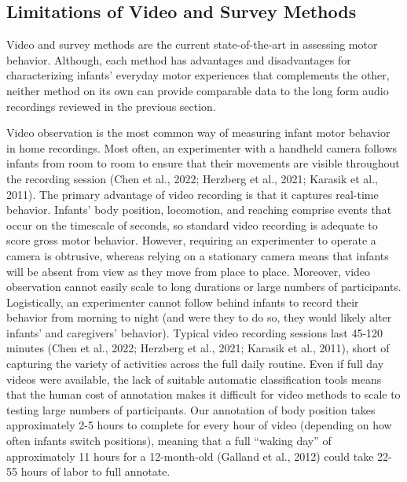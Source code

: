 \documentclass[
  man]{apa6}
\begin{document}
\hypertarget{limitations-of-video-and-survey-methods}{%
\subsection{Limitations of Video and Survey Methods}\label{limitations-of-video-and-survey-methods}}

Video and survey methods are the current state-of-the-art in assessing motor behavior. Although, each method has advantages and disadvantages for characterizing infants' everyday motor experiences that complements the other, neither method on its own can provide comparable data to the long form audio recordings reviewed in the previous section.

Video observation is the most common way of measuring infant motor behavior in home recordings. Most often, an experimenter with a handheld camera follows infants from room to room to ensure that their movements are visible throughout the recording session (Chen et al., 2022; Herzberg et al., 2021; Karasik et al., 2011). The primary advantage of video recording is that it captures real-time behavior. Infants' body position, locomotion, and reaching comprise events that occur on the timescale of seconds, so standard video recording is adequate to score gross motor behavior. However, requiring an experimenter to operate a camera is obtrusive, whereas relying on a stationary camera means that infants will be absent from view as they move from place to place. Moreover, video observation cannot easily scale to long durations or large numbers of participants. Logistically, an experimenter cannot follow behind infants to record their behavior from morning to night (and were they to do so, they would likely alter infants' and caregivers' behavior). Typical video recording sessions last 45-120 minutes (Chen et al., 2022; Herzberg et al., 2021; Karasik et al., 2011), short of capturing the variety of activities across the full daily routine. Even if full day videos were available, the lack of suitable automatic classification tools means that the human cost of annotation makes it difficult for video methods to scale to testing large numbers of participants. Our annotation of body position takes approximately 2-5 hours to complete for every hour of video (depending on how often infants switch positions), meaning that a full ``waking day'' of approximately 11 hours for a 12-month-old (Galland et al., 2012) could take 22-55 hours of labor to full annotate.
\end{document}
